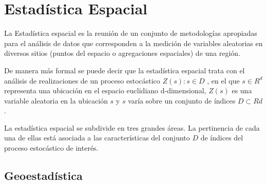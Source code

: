 \section{Estadística Espacial}

La Estadística espacial es la reunión de un conjunto de metodologías apropiadas para el
análisis de datos que corresponden a la medición de variables aleatorias en diversos sitios
(puntos del espacio o agregaciones espaciales) de una región. 

De manera más formal se puede decir que la estadística espacial trata con el análisis de 
realizaciones de un proceso estocástico ${ Z ( s ) : s \in D }$ , en el que $s \in R^d$ representa 
una ubicación en el espacio euclidiano d-dimensional, $Z(s)$ es una variable aleatoria en
la ubicación $s$ y $s$ varía sobre un conjunto de índices $D \subset R d$. \cite{giraldo}

La estadística espacial se subdivide en tres grandes áreas. La pertinencia de cada una
de ellas está asociada a las características del conjunto $D$ de índices del proceso estocástico
de interés. \cite{giraldo}

\subsection{Geoestadística}

